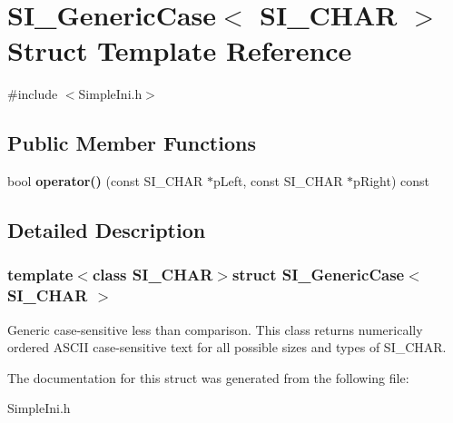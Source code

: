 \hypertarget{a00037}{}\section{S\+I\+\_\+\+Generic\+Case$<$ S\+I\+\_\+\+C\+H\+A\+R $>$ Struct Template Reference}
\label{a00037}


{\ttfamily \#include $<$Simple\+Ini.\+h$>$}

\subsection*{Public Member Functions}
\begin{DoxyCompactItemize}
\item 
\hypertarget{a00037_af91c0d1b328b5c1bd15053204dcfa9b1}{}bool {\bfseries operator()} (const S\+I\+\_\+\+C\+H\+A\+R $\ast$p\+Left, const S\+I\+\_\+\+C\+H\+A\+R $\ast$p\+Right) const \label{a00037_af91c0d1b328b5c1bd15053204dcfa9b1}

\end{DoxyCompactItemize}


\subsection{Detailed Description}
\subsubsection*{template$<$class S\+I\+\_\+\+C\+H\+A\+R$>$struct S\+I\+\_\+\+Generic\+Case$<$ S\+I\+\_\+\+C\+H\+A\+R $>$}

Generic case-\/sensitive less than comparison. This class returns numerically ordered A\+S\+C\+I\+I case-\/sensitive text for all possible sizes and types of S\+I\+\_\+\+C\+H\+A\+R. 

The documentation for this struct was generated from the following file\+:\begin{DoxyCompactItemize}
\item 
Simple\+Ini.\+h\end{DoxyCompactItemize}
